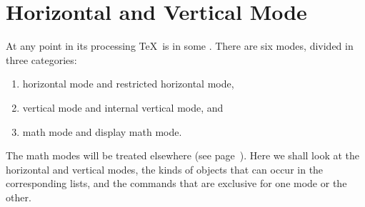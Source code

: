 \documentclass[twoside,letterpaper,openright]{rapport3}
\begin{document}
\chapter{Horizontal and Vertical Mode}\label{hvmode}
\label{chap:hvmode}

At any point in its processing \TeX\ is in some .
There are six modes, divided in three categories:
\begin{enumerate}
\item horizontal mode and restricted horizontal mode,
\item vertical mode and internal vertical mode, and
\item math mode and display math mode.
\end{enumerate}
The math modes will be treated elsewhere (see page~\pageref{math:modes}).
Here we shall look
at the horizontal and vertical modes, the kinds of objects
that can occur in the corresponding lists, and the
commands that are exclusive for one mode or the other. 
\end{document}
